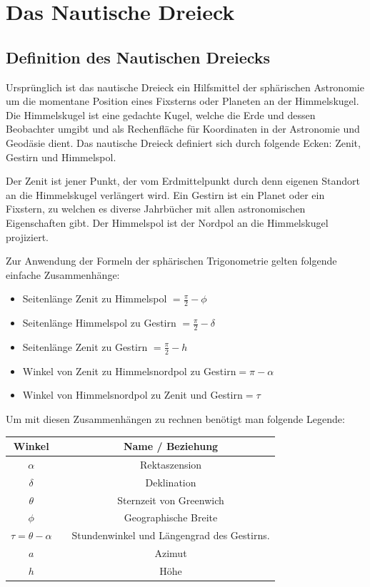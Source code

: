 \section{Das Nautische Dreieck}
\subsection{Definition des Nautischen Dreiecks}
Ursprünglich ist das nautische Dreieck ein Hilfsmittel der sphärischen Astronomie um die momentane Position eines Fixsterns oder Planeten an der Himmelskugel. 
Die Himmelskugel ist eine gedachte Kugel, welche die Erde und dessen Beobachter umgibt und als Rechenfläche für Koordinaten in der Astronomie und Geodäsie dient.
Das nautische Dreieck definiert sich durch folgende Ecken: Zenit, Gestirn und Himmelspol.

Der Zenit ist jener Punkt, der vom Erdmittelpunkt durch denn eigenen Standort an die Himmelskugel verlängert wird.
Ein Gestirn ist ein Planet oder ein Fixstern, zu welchen es diverse Jahrbücher mit allen astronomischen Eigenschaften gibt. 
Der Himmelspol ist der Nordpol an die Himmelskugel projiziert.

Zur Anwendung der Formeln der sphärischen Trigonometrie gelten folgende einfache Zusammenhänge:
\begin{itemize}
	\item Seitenlänge Zenit zu Himmelspol $= \frac{\pi}{2} - \phi $
	\item Seitenlänge Himmelspol zu Gestirn $= \frac{\pi}{2} - \delta$
	\item Seitenlänge Zenit zu Gestirn $= \frac{\pi}{2} - h$
	\item Winkel von Zenit zu Himmelsnordpol zu Gestirn$=\pi - \alpha$
	\item Winkel von Himmelsnordpol zu Zenit und Gestirn$= \tau$
\end{itemize}
Um mit diesen Zusammenhängen zu rechnen benötigt man folgende Legende:
\begin{center}
	\begin{tabular}{ c c c }
		Winkel && Name / Beziehung \\ 
		\hline
		$\alpha$ && Rektaszension \\  
		$\delta$ && Deklination \\
		$\theta$ && Sternzeit von Greenwich\\
		$\phi$  &&  Geographische Breite\\
		$\tau=\theta-\alpha$ && Stundenwinkel und Längengrad des Gestirns. \\
		$a$ &&      Azimut\\
		$h$ &&      Höhe
	\end{tabular}
\end{center}

